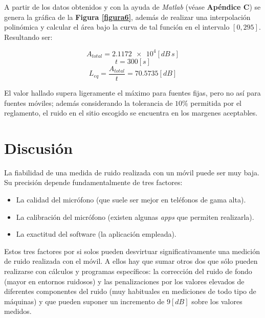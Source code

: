 \documentclass[letter,11pt]{article}
\newcommand{\source}[1]{\vspace{-11pt} \caption*{\small{\textbf{Nota:} {#1}}}}
\begin{document}

A partir de los datos obtenidos y con la ayuda de \emph{Matlab} (véase
\textbf{Apéndice C}) se genera la gráfica de la \textbf{Figura \ref{figura6}},
además de realizar una interpolación polinómica y calcular el área bajo la
curva de tal función en el intervalo $[0,295]$. Resultando ser:

\begin{equation*}
    A_{total} = \num{2.1172e4} [dB\,s]
\end{equation*}
\begin{equation*}
    t = 300 [s]
\end{equation*}
\begin{equation*}
    L_{eq} = \frac{A_{total}}{t} = 70.5735 [dB]
\end{equation*}
\vspace{0.10cm}

El valor hallado supera ligeramente el máximo para fuentes fijas, pero no así
para fuentes móviles; además considerando la tolerancia de $10\%$ permitida por
el reglamento, el ruido en el sitio escogido se encuentra en los margenes
aceptables.

\section{Discusión}

La fiabilidad de una medida de ruido realizada con un móvil puede ser muy baja.
Su precisión depende fundamentalmente de tres factores:

\begin{itemize}
\item La calidad del micrófono (que suele ser mejor en teléfonos de gama alta).
\item La calibración del micrófono (existen algunas \emph{apps} que permiten
    realizarla).
\item La exactitud del software (la aplicación empleada).
\end{itemize}

Estos tres factores por si solos pueden desvirtuar significativamente una
medición de ruido realizada con el móvil. A ellos hay que sumar otros dos que
sólo pueden realizarse con cálculos y programas específicos: la corrección del
ruido de fondo (mayor en entornos ruidosos) y las penalizaciones por los valores
elevados de diferentes componentes del ruido (muy habituales en mediciones de
todo tipo de máquinas) y que pueden suponer un incremento de $9 [dB]$ sobre los
valores medidos.
\end{document}
